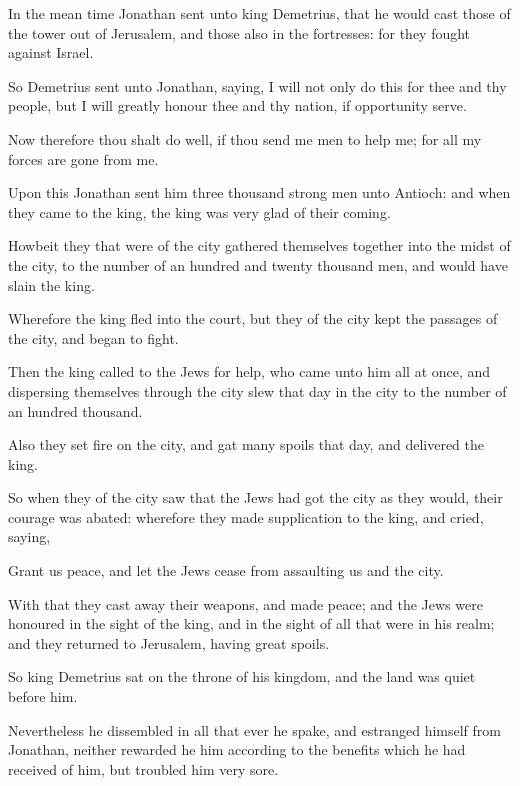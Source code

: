 {\par }{\PP {}In the mean time Jonathan sent unto king Demetrius, that he would cast those of the tower out of Jerusalem, and those also in the fortresses: for they fought against Israel.
\par }{\PP {}So Demetrius sent unto Jonathan, saying, I will not only do this for thee and thy people, but I will greatly honour thee and thy nation, if opportunity serve.
\par }{\PP {}Now therefore thou shalt do well, if thou send me men to help me; for all my forces are gone from me.
\par }{\PP {}Upon this Jonathan sent him three thousand strong men unto Antioch: and when they came to the king, the king was very glad of their coming.
\par }{\PP {}Howbeit they that were of the city gathered themselves together into the midst of the city, to the number of an hundred and twenty thousand men, and would have slain the king.
\par }{\PP {}Wherefore the king fled into the court, but they of the city kept the passages of the city, and began to fight.
\par }{\PP {}Then the king called to the Jews for help, who came unto him all at once, and dispersing themselves through the city slew that day in the city to the number of an hundred thousand.
\par }{\PP {}Also they set fire on the city, and gat many spoils that day, and delivered the king.
\par }{\PP {}So when they of the city saw that the Jews had got the city as they would, their courage was abated: wherefore they made supplication to the king, and cried, saying,
\par }{\PP {}Grant us peace, and let the Jews cease from assaulting us and the city.
\par }{\PP {}With that they cast away their weapons, and made peace; and the Jews were honoured in the sight of the king, and in the sight of all that were in his realm; and they returned to Jerusalem, having great spoils.
\par }{\PP {}So king Demetrius sat on the throne of his kingdom, and the land was quiet before him.
\par }{\PP {}Nevertheless he dissembled in all that ever he spake, and estranged himself from Jonathan, neither rewarded he him according to the benefits which he had received of him, but troubled him very sore.
}
